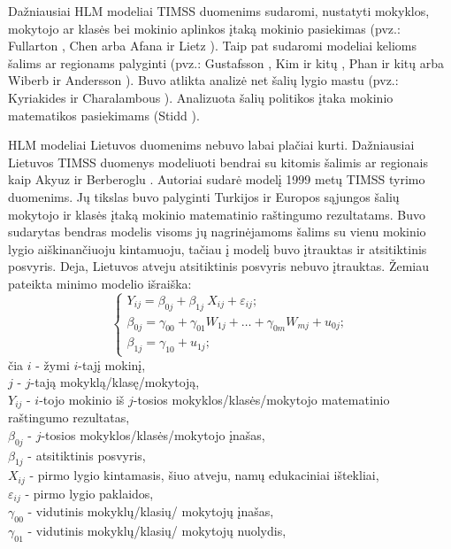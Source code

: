 \documentclass[12pt,a4paper]{article}
\begin{document}
\indent Dažniausiai HLM modeliai TIMSS duomenims sudaromi, nustatyti mokyklos, mokytojo ar klasės bei mokinio aplinkos įtaką mokinio pasiekimas (pvz.: Fullarton \cite{timssSch1}, Chen \cite{timssSchool2} arba Afana ir Lietz \cite{timssCpalyg1}). Taip pat sudaromi modeliai kelioms šalims ar regionams palyginti (pvz.: Gustafsson \cite{timssCpalyg}, Kim ir kitų \cite{timssCpalyg2}, Phan ir kitų \cite{timssCpalyg3} arba Wiberb ir Andersson \cite{timssCpalyg4}). Buvo atlikta analizė net šalių lygio mastu (pvz.: Kyriakides ir Charalambous \cite{countryHLM}). Analizuota šalių politikos įtaka mokinio matematikos pasiekimams (Stidd \cite{timssPol}).

\indent HLM modeliai Lietuvos duomenims nebuvo labai plačiai kurti. Dažniausiai Lietuvos TIMSS duomenys modeliuoti bendrai su kitomis šalimis ar regionais kaip Akyuz ir Berberoglu \cite{2007All}. Autoriai sudarė modelį 1999 metų TIMSS tyrimo duomenims. Jų tikslas buvo palyginti Turkijos ir Europos sąjungos šalių mokytojo ir klasės įtaką mokinio matematinio raštingumo rezultatams. Buvo sudarytas bendras modelis visoms jų nagrinėjamoms šalims su vienu mokinio lygio aiškinančiuoju kintamuoju, tačiau į modelį buvo įtrauktas ir atsitiktinis posvyris. Deja, Lietuvos atveju atsitiktinis posvyris nebuvo įtrauktas. Žemiau pateikta minimo modelio išraiška:
\[ \left\{
\begin{array}{l}
Y_{ij} = \beta_{0j}+\beta_{1j}\ X_{ij}+\varepsilon_{ij}; \\
\beta_{0j} = \gamma_{00} + \gamma_{01} W_{1j}+\dots+\gamma_{0m} W_{mj}+u_{0j};\\
\beta_{1j} = \gamma_{10} + u_{1j};
\end{array} \right.
\]
\small
čia $i$ - žymi $i$-tajį mokinį,\\
$j$ - $j$-tają mokyklą/klasę/mokytoją,\\
$Y_{ij}$ - $i$-tojo mokinio iš $j$-tosios mokyklos/klasės/mokytojo matematinio raštingumo rezultatas,\\
$\beta_{0j}$ - $j$-tosios mokyklos/klasės/mokytojo įnašas,\\
$\beta_{1j}$ - atsitiktinis posvyris,\\
$X_{ij}$ - pirmo lygio kintamasis, šiuo atveju, namų edukaciniai ištekliai, \\
$\varepsilon_{ij}$ - pirmo lygio paklaidos,\\
$\gamma_{00}$ - vidutinis mokyklų/klasių/ mokytojų įnašas,\\
$\gamma_{01}$ - vidutinis mokyklų/klasių/ mokytojų nuolydis,\\
\end{document}
